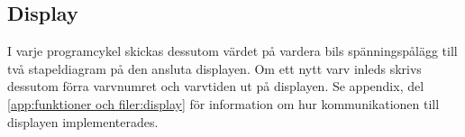 \subsection{Display}

I varje programcykel skickas dessutom värdet på vardera bils spänningspålägg
till två stapeldiagram på den ansluta displayen. Om ett nytt varv inleds skrivs
dessutom förra varvnumret och varvtiden ut på displayen. Se appendix, del~
\ref{app:funktioner och filer:display} för information om hur kommunikationen
till displayen implementerades.

